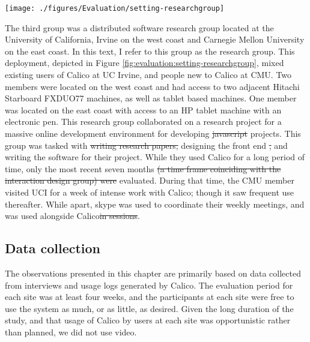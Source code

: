 \documentclass[12pt,fleqn]{ucithesis}
\providecommand{\DIFaddtex}[1]{{\protect\color{blue}\uwave{#1}}} %
\providecommand{\DIFdeltex}[1]{{\protect\color{red}\sout{#1}}}                      %
\providecommand{\DIFaddbegin}{} %
\providecommand{\DIFaddend}{} %
\providecommand{\DIFdelbegin}{} %
\providecommand{\DIFdelend}{} %
\providecommand{\DIFadd}[1]{\texorpdfstring{\DIFaddtex{#1}}{#1}} %
\providecommand{\DIFdel}[1]{\texorpdfstring{\DIFdeltex{#1}}{}} %
\begin{document}
\begin{figure*}[tbh]
  \centering
  \texttt{[image: ./figures/Evaluation/setting-researchgroup]}
  \caption{The physical setup of the research group}
  \label{fig:evaluation:setting-researchgroup}
\end{figure*}

The third group was a distributed software research group located at the University of California, Irvine on the west coast and Carnegie Mellon University on the east coast. In this text, I refer to this group as the research group. This deployment, depicted in Figure \ref{fig:evaluation:setting-researchgroup}, mixed existing users of Calico at UC Irvine, and people new to Calico at CMU. Two members were located on the west coast and had access to two adjacent Hitachi Starboard FXDUO77 machines, as well as tablet based machines. One member was located on the east coast with access to an HP tablet machine with an electronic pen. This research group collaborated on a research project for a massive online development environment for developing \DIFdelbegin \DIFdel{javascript }\DIFdelend \DIFaddbegin \DIFadd{Javascript }\DIFaddend projects. This group was tasked with \DIFdelbegin \DIFdel{writing research papers, }\DIFdelend designing the front end \DIFdelbegin \DIFdel{, }\DIFdelend and writing the software for their project. While they used Calico for a long period of time, only the most recent seven months \DIFdelbegin \DIFdel{(a time frame coinciding with the interaction design group) were }\DIFdelend \DIFaddbegin \DIFadd{as }\DIFaddend evaluated. During that time, the CMU member visited UCI for a week of intense work with Calico; though it saw frequent use thereafter. While apart, skype was used to coordinate their weekly meetings, and was used alongside Calico\DIFdelbegin \DIFdel{in sessions}\DIFdelend .

\subsection{Data collection}

The observations presented in this chapter are primarily based on data collected from interviews and usage logs generated by Calico. The evaluation period for each site was at least four weeks, and the participants at each site were free to use the system as much, or as little, as desired. Given the long duration of the study, and that usage of Calico by users at each site was opportunistic rather than planned, we did not use video.
\end{document}
